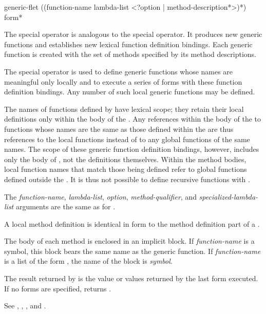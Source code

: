 \begin{defspec}
generic-flet ({(function-name lambda-list
                <?option | {method-description}*>)}*)
            {form}*

The  special operator is analogous to the
 special operator.  It produces new generic functions and
establishes new lexical function definition bindings.  Each generic
function is created with the set of methods specified by its method
descriptions.


The special operator  is used to define generic functions whose
names are meaningful only locally and to execute a series of forms
with these function definition bindings.  Any number of such local
generic functions may be defined.


The names of functions defined by  have lexical
scope; they retain their local definitions only within the body of the
.  Any references within the body of the 
 to functions whose names are the same as those defined
within the  are thus references to the local
functions instead of to any global functions of the same names.  The
scope of these generic function definition bindings, however, includes only
the body of , not the definitions themselves.
Within the method bodies, local function names that match those
being defined refer to global functions defined outside the 
.  It is thus not possible to define recursive functions
with .


The \emph{function-name\/}, \emph{lambda-list\/}, \emph{option}, \emph{
method-qualifier}, and \emph{specialized-lambda-list\/} arguments are
the same as for .


A  local method definition is identical in form to the
method definition part of a .


The body of each method is enclosed in an implicit block.  If \emph{
function-name\/} is a symbol, this block bears the same name as
the generic function.  If \emph{function-name\/} is a list of the
form , the name of the block is \emph{
symbol}.


The result returned by  is the value or values
returned by the last form executed.  If no forms are specified, 
 returns .

See , , , and .
\end{defspec}


